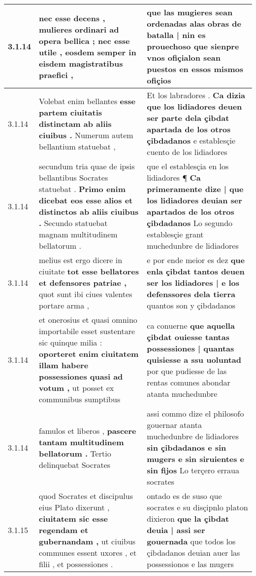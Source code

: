 \begin{tabular}{|p{1cm}|p{6.5cm}|p{6.5cm}|}
3.1.14 & nec esse decens , \textbf{ mulieres ordinari ad opera bellica ; nec esse utile , } eosdem semper in eisdem magistratibus praefici , & que las mugieres sean ordenadas \textbf{ alas obras de batalla | nin es prouechoso } que sienpre vnos ofiçialon sean puestos en essos mismos ofiçios \\\hline
3.1.14 & Volebat enim bellantes \textbf{ esse partem ciuitatis distinctam ab aliis ciuibus . } Numerum autem bellantium statuebat , & Et los labradores . \textbf{ Ca dizia que los lidiadores deuen ser parte dela çibdat apartada de los otros çibdadanos } e establesçie cuento de los lidiadores \\\hline
3.1.14 & secundum tria quae de ipsis bellantibus Socrates statuebat . \textbf{ Primo enim dicebat eos esse alios et distinctos ab aliis ciuibus . } Secundo statuebat magnam multitudinem bellatorum . & que el establesçia en los lidiadores ¶ \textbf{ Ca primeramente dize | que los lidiadores deuian ser apartados de los otros çibdadanos } Lo segundo establesçie grant muchedunbre de lidiadores \\\hline
3.1.14 & melius est ergo dicere in ciuitate \textbf{ tot esse bellatores et defensores patriae , } quot sunt ibi ciues valentes portare arma , & e por ende meior es dez \textbf{ que enla çibdat tantos deuen ser los lidiadores | e los defenssores dela tierra } quantos son y çibdadanos \\\hline
3.1.14 & et onerosius et quasi omnino importabile esset sustentare sic quinque milia : \textbf{ oporteret enim ciuitatem illam habere possessiones quasi ad votum , } ut posset ex communibus sumptibus & ca conuerne \textbf{ que aquella çibdat ouiesse tantas possessiones | quantas quisiesse a ssu uoluntad } por que pudiesse de las rentas comunes abondar atanta muchedunbre \\\hline
3.1.14 & famulos et liberos , \textbf{ pascere tantam multitudinem bellatorum . } Tertio delinquebat Socrates & assi commo dize el philosofo gouernar atanta muchedunbre de lidiadores \textbf{ sin çibdadanos e sin mugers e sin siruientes e sin fijos } Lo terçero erraua socrates \\\hline
3.1.15 & quod Socrates et discipulus eius Plato dixerunt , \textbf{ ciuitatem sic esse regendam et gubernandam , } ut ciuibus communes essent uxores , et filii , et possessiones . & ontado es de suso que socrates e su disçipnlo platon dixieron \textbf{ que la çibdat deuia | assi ser gouernada } que todos los çibdadanos deuian auer las possessionos e las mugers \\\hline

\end{tabular}
